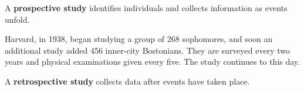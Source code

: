 \documentclass{beamer}
\begin{document}
\begin{frame}
\begin{definition}
A \textbf{prospective study} identifies individuals and collects information as events unfold.
\end{definition}\pause

\begin{example}
Harvard, in 1938, began studying a group of 268 sophomores, and soon an additional study added 456 inner-city Bostonians. They are surveyed  every two years and physical examinations given every five. The study continues to this day.
\end{example}\pause

\begin{definition}
A \textbf{retrospective study} collects data after events have taken place.
\end{definition}\pause

\begin{example}

\end{example}
\end{frame}
\end{document}
